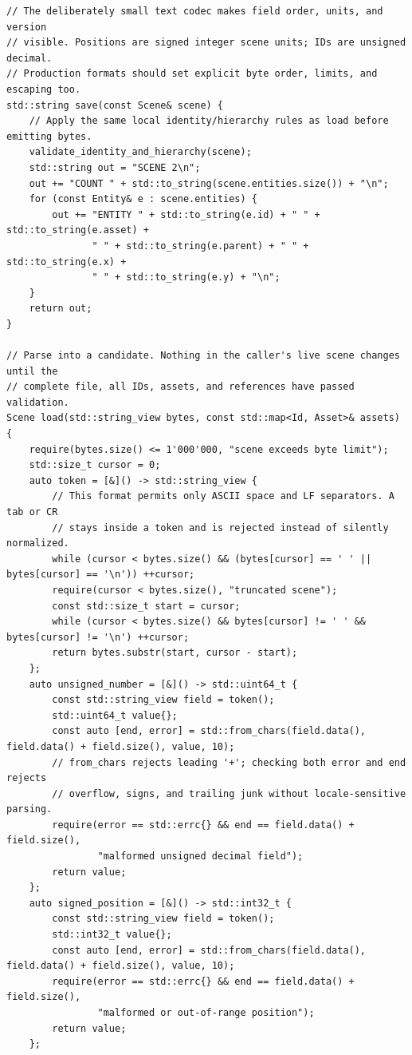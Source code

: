 \begin{verbatim}
// The deliberately small text codec makes field order, units, and version
// visible. Positions are signed integer scene units; IDs are unsigned decimal.
// Production formats should set explicit byte order, limits, and escaping too.
std::string save(const Scene& scene) {
    // Apply the same local identity/hierarchy rules as load before emitting bytes.
    validate_identity_and_hierarchy(scene);
    std::string out = "SCENE 2\n";
    out += "COUNT " + std::to_string(scene.entities.size()) + "\n";
    for (const Entity& e : scene.entities) {
        out += "ENTITY " + std::to_string(e.id) + " " + std::to_string(e.asset) +
               " " + std::to_string(e.parent) + " " + std::to_string(e.x) +
               " " + std::to_string(e.y) + "\n";
    }
    return out;
}

// Parse into a candidate. Nothing in the caller's live scene changes until the
// complete file, all IDs, assets, and references have passed validation.
Scene load(std::string_view bytes, const std::map<Id, Asset>& assets) {
    require(bytes.size() <= 1'000'000, "scene exceeds byte limit");
    std::size_t cursor = 0;
    auto token = [&]() -> std::string_view {
        // This format permits only ASCII space and LF separators. A tab or CR
        // stays inside a token and is rejected instead of silently normalized.
        while (cursor < bytes.size() && (bytes[cursor] == ' ' || bytes[cursor] == '\n')) ++cursor;
        require(cursor < bytes.size(), "truncated scene");
        const std::size_t start = cursor;
        while (cursor < bytes.size() && bytes[cursor] != ' ' && bytes[cursor] != '\n') ++cursor;
        return bytes.substr(start, cursor - start);
    };
    auto unsigned_number = [&]() -> std::uint64_t {
        const std::string_view field = token();
        std::uint64_t value{};
        const auto [end, error] = std::from_chars(field.data(), field.data() + field.size(), value, 10);
        // from_chars rejects leading '+'; checking both error and end rejects
        // overflow, signs, and trailing junk without locale-sensitive parsing.
        require(error == std::errc{} && end == field.data() + field.size(),
                "malformed unsigned decimal field");
        return value;
    };
    auto signed_position = [&]() -> std::int32_t {
        const std::string_view field = token();
        std::int32_t value{};
        const auto [end, error] = std::from_chars(field.data(), field.data() + field.size(), value, 10);
        require(error == std::errc{} && end == field.data() + field.size(),
                "malformed or out-of-range position");
        return value;
    };


\end{verbatim}
